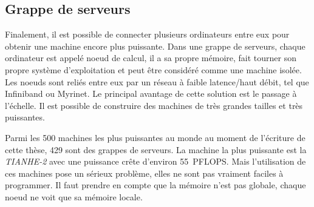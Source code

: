 \subsection{Grappe de serveurs}
Finalement, il est possible de connecter plusieurs ordinateurs entre eux pour obtenir une machine encore plus puissante.
%
Dans une grappe de serveurs, chaque ordinateur est appelé noeud de calcul, il a sa propre mémoire, fait tourner son propre système d'exploitation et peut être considéré comme une machine isolée.
%
Les noeuds sont reliés entre eux par un réseau à faible latence/haut débit, tel que Infiniband ou Myrinet.
%
Le principal avantage de cette solution est le passage à l'échelle.
%
Il est possible de construire des machines de très grandes tailles et très puissantes.

Parmi les 500 machines les plus puissantes au monde au moment de l'écriture de cette thèse, 429 sont des grappes de serveurs.
%
La machine la plus puissante est la {\em TIANHE-2} avec une puissance crête d'environ 55~PFLOPS.
%
Mais l'utilisation de ces machines pose un sérieux problème, elles ne sont pas vraiment faciles à programmer.
%
Il faut prendre en compte que la mémoire n'est pas globale, chaque noeud ne voit que sa mémoire locale.
